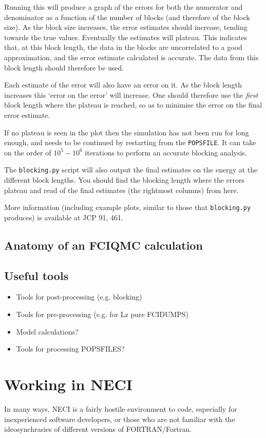 \documentclass[a4paper,notitlepage]{scrreprt}
\let\code\lstinline
\begin{document}
    Running this will produce a graph of the errors for both the numerator and
    denominator as a function of the number of blocks (and therefore of the
    block size). As the block size increases, the error estimates should
    increase, tending towards the true values. Eventually the estimates will
    plateau. This indicates that, at this block length, the data in the blocks
    are uncorrelated to a good approximation, and the error estimate calculated
    is accurate. The data from this block length should therefore be used.

    Each estimate of the error will also have an error on it. As the block
    length increases this `error on the error' will increase. One should
    therefore use the \emph{first} block length where the plateau is reached,
    so as to minimise the error on the final error estimate.

    If no plateau is seen in the plot then the simulation has not been run for
	long enough, and needs to be continued by restarting from the \code{POPSFILE}.
    It can take on the order of $10^5-10^6$ iterations to perform an accurate
    blocking analysis.

	The \code{blocking.py} script will also output the final estimates on the energy
    at the different block lengths. You should find the blocking length where
    the errors plateau and read of the final estimates (the rightmost columns)
    from here.

	More information (including example plots, similar to those that
	\code{blocking.py} produces) is available at JCP 91, 461.

\section{Anatomy of an FCIQMC calculation}
\section{Useful tools}
\begin{itemize}
	\item Tools for post-processing (e.g. blocking)
	\item Tools for pre-processing (e.g. for Lz pure FCIDUMPS)
	\item Model calculations?
	\item Tools for processing POPSFILES?
\end{itemize}


\chapter{Working in NECI}
In many ways, NECI is a fairly hostile environment to code, especially for
inexperienced software developers, or those who are not familiar with the
ideosynchrasies of different versions of FORTRAN/Fortran.
\end{document}
